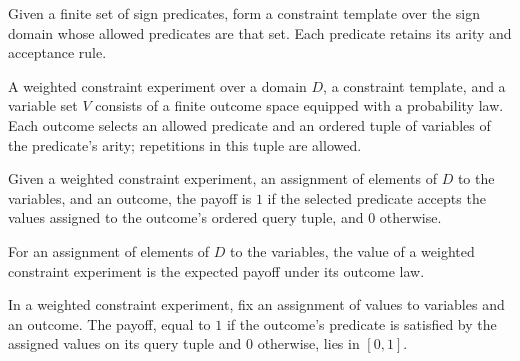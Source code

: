 \begin{definition}
\label{FABL.signPredicateSetTemplate}
\leanok
{}
Given a finite set of sign predicates, form a constraint template over the sign domain
whose allowed predicates are that set. Each predicate retains its arity and acceptance
rule.
\end{definition}

\begin{definition}
\label{FABL.WeightedConstraintExperiment}
\leanok
{}
A weighted constraint experiment over a domain $D$, a constraint template, and a
variable set $V$ consists of a finite outcome space equipped with a probability law.
Each outcome selects an allowed predicate and an ordered tuple of variables of the
predicate's arity; repetitions in this tuple are allowed.
\end{definition}

\begin{definition}
\label{FABL.WeightedConstraintExperiment.payoff}
\leanok
Given a weighted constraint experiment, an assignment of elements of $D$ to the
variables, and an outcome, the payoff is $1$ if the selected predicate accepts the
values assigned to the outcome's ordered query tuple, and $0$ otherwise.
\end{definition}

\begin{definition}
\label{FABL.WeightedConstraintExperiment.value}
\leanok
{}
For an assignment of elements of $D$ to the variables, the value of a weighted
constraint experiment is the expected payoff under its outcome law.
\end{definition}

\begin{theorem}
\label{FABL.WeightedConstraintExperiment.payoff_mem_Icc}
\leanok
{}
In a weighted constraint experiment, fix an assignment of values to variables and an
outcome. The payoff, equal to $1$ if the outcome's predicate is satisfied by the
assigned values on its query tuple and $0$ otherwise, lies in $[0,1]$.
\end{theorem}

